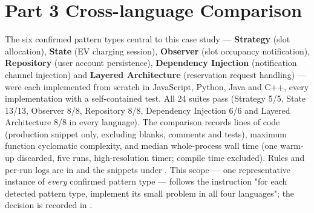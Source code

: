 \documentclass[11pt,a4paper]{article}
\begin{document}
\section{Part 3 Cross-language Comparison}
The six confirmed pattern types central to this case study --- \textbf{Strategy}
(slot allocation), \textbf{State} (EV charging session), \textbf{Observer} (slot
occupancy notification), \textbf{Repository} (user account persistence),
\textbf{Dependency Injection} (notification channel injection) and \textbf{Layered
Architecture} (reservation request handling) --- were each implemented from
scratch in JavaScript, Python, Java and C++, every implementation with a
self-contained test. All 24 suites pass (Strategy 5/5, State 13/13, Observer 8/8,
Repository 8/8, Dependency Injection 6/6 and Layered Architecture 8/8 in every
language). The comparison records lines of code (production snippet only,
excluding blanks, comments and tests), maximum function cyclomatic complexity, and
median whole-process wall time (one warm-up discarded, five runs,
high-resolution timer; compile time excluded). Rules and per-run logs are in
 and the snippets under . This
scope --- one representative instance of \emph{every} confirmed pattern type ---
follows the instruction "for each detected pattern type, implement its small
problem in all four languages"; the decision is recorded in
.
\end{document}

